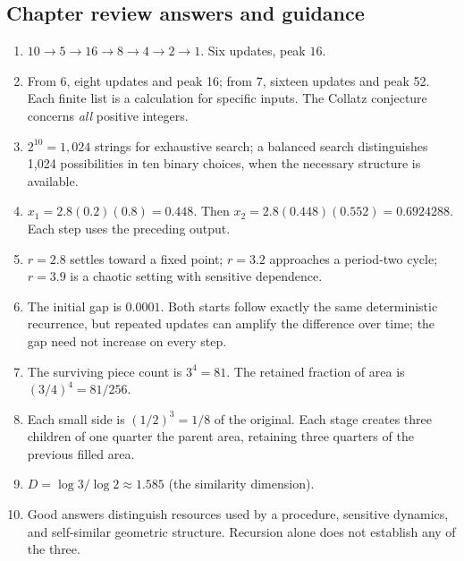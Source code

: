\documentclass[11pt,letterpaper]{article}
\begin{document}
{\subsection*{Chapter review answers and guidance}
\begin{enumerate}
\item $10\to5\to16\to8\to4\to2\to1$. Six updates, peak $16$.
\item From $6$, eight updates and peak 16; from $7$, sixteen updates and peak 52. Each finite list is a calculation for specific inputs. The Collatz conjecture concerns \emph{all} positive integers.
\item $2^{10}=1{,}024$ strings for exhaustive search; a balanced search distinguishes 1,024 possibilities in ten binary choices, when the necessary structure is available.
\item $x_1=2.8(0.2)(0.8)=0.448$. Then $x_2=2.8(0.448)(0.552)=0.6924288$. Each step uses the preceding output.
\item $r=2.8$ settles toward a fixed point; $r=3.2$ approaches a period-two cycle; $r=3.9$ is a chaotic setting with sensitive dependence.
\item The initial gap is $0.0001$. Both starts follow exactly the same deterministic recurrence, but repeated updates can amplify the difference over time; the gap need not increase on every step.
\item The surviving piece count is $3^4=81$. The retained fraction of area is $(3/4)^4=81/256$.
\item Each small side is $(1/2)^3=1/8$ of the original. Each stage creates three children of one quarter the parent area, retaining three quarters of the previous filled area.
\item $D=\log 3/\log 2\approx1.585$ (the similarity dimension).
\item Good answers distinguish resources used by a procedure, sensitive dynamics, and self-similar geometric structure. Recursion alone does not establish any of the three.
\end{enumerate}
}
\end{document}

